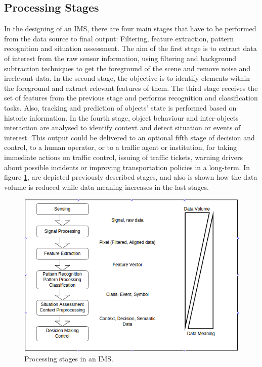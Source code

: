 \subsection{Processing Stages}

In the designing of an IMS, there are four main stages that have to be performed from the data source to final output: Filtering, feature extraction, pattern recognition and situation assessment. The aim of the first stage is to extract data of interest from the raw sensor information, using filtering and background subtraction techniques to get the foreground of the scene and remove noise and irrelevant data. In the second stage, the objective is to identify elements within the foreground and extract relevant features of them. The third stage receives the set of features from the previous stage and performs recognition and classification tasks. Also, tracking and prediction of objects' state is performed based on historic information. In the fourth stage, object behaviour and inter-objects interaction are analysed to identify context and detect situation or events of interest. This output could be delivered to an optional fifth stage of decision and control, to a human operator, or to a traffic agent or institution, for taking immediate actions on traffic control, issuing of traffic tickets, warning drivers about possible incidents or improving transportation policies in a long-term. In figure \ref{proc_stages}, are depicted previously described stages, and also is shown how the data volume is reduced while data meaning increases in the last stages.

\begin{figure}[ht!]
\centering
\includegraphics[scale=0.55]{fig/3/proc_stages.png}
\caption{Processing stages in an IMS.}
\label{proc_stages}
\end{figure}

